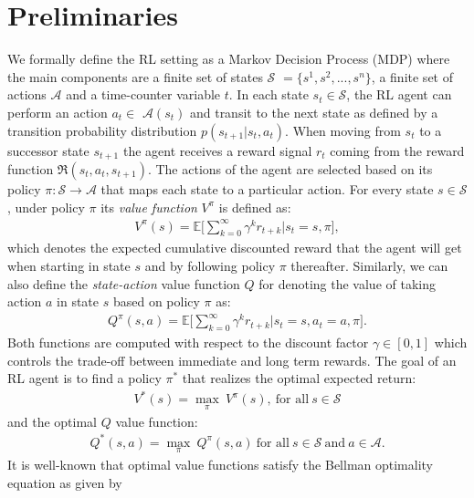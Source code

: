 \section{Preliminaries}
\label{sec:ijcnn_preliminaries}

We formally define the RL setting as a Markov Decision Process (MDP) where the main components are a finite set of states $\mathcal{S}$ $=\{s^{1}, s^{2},...,s^{n}\}$, a finite set of actions $\mathcal{A}$ and a time-counter variable $t$. In each state $s_{t}\in \mathcal{S}$, the RL agent can perform an action $a_{t} \in$ $\mathcal{A}(s_t)$ and transit to the next state as defined by a transition probability distribution $p(s_{t+1} | s_{t}, a_{t})$.
 When moving from $s_t$ to a successor state $s_{t+1}$ the agent receives a reward signal $r_t$ coming from the reward function $\Re (s_{t}, a_{t}, s_{t+1})$. The actions of the agent are selected based on its policy $\pi:\mathcal{S} \rightarrow \mathcal{A}$ that maps each state to a particular action. For every state $s \in \mathcal{S}$, under policy $\pi$ its \textit{value function} $V^{\pi}$ is defined as:
\begin{align}
    V^{\pi}(s)=\mathds{E}\bigg[\sum_{k=0}^{\infty}\gamma^{k}r_{t+k}\bigg| s_t = s, \pi \bigg],
\end{align}
which denotes the expected cumulative discounted reward that the agent will get when starting in state $s$ and by following policy $\pi$ thereafter. Similarly, we can also define the \textit{state-action} value function $Q$ for denoting the value of taking action $a$ in state $s$ based on policy $\pi$ as:
\begin{align}
    Q^{\pi}(s,a)=\mathds{E}\bigg[\sum_{k=0}^{\infty}\gamma^{k}r_{t+k} \bigg| s_t = s, a_t=a, \pi\bigg].
\end{align}
Both functions are computed with respect to the discount factor $\gamma \in [0,1]$ which controls the trade-off between immediate and long term rewards. The goal of an RL agent is to find a policy $\pi^{*}$ that realizes the optimal expected return:
\begin{align}
 V^{*}(s)=\underset{\pi}{\max}\:V^{\pi}(s), \ \text{for all} \ s\in\mathcal{S}
\end{align}
and the optimal $Q$ value function:
\begin{align}
Q^{*}(s,a)= \underset{\pi}{\max}\:Q^{\pi}(s,a) \ \text{for all} \ s\in\mathcal{S} \ \text{and} \ a \in\mathcal{A}.
\end{align}
It is well-known that optimal value functions satisfy the Bellman optimality equation as given by
